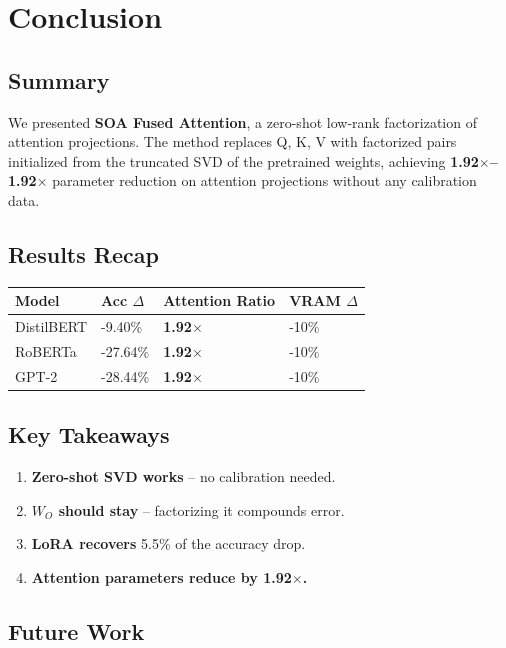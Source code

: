 \section{Conclusion}

\subsection{Summary}

We presented \textbf{SOA Fused Attention}, a zero-shot low-rank factorization of 
attention projections. The method replaces Q, K, V with factorized pairs 
initialized from the truncated SVD of the pretrained weights, achieving 
\textbf{1.92$\times$--1.92$\times$} parameter reduction on attention projections 
without any calibration data.

\subsection{Results Recap}

\begin{table}[H]
\centering
\small
\begin{tabular}{llll}
\toprule
\textbf{Model} & \textbf{Acc $\Delta$} & \textbf{Attention Ratio} & \textbf{VRAM $\Delta$} \\
\midrule
DistilBERT & -9.40\% & \textbf{1.92$\times$} & -10\% \\
RoBERTa & -27.64\% & \textbf{1.92$\times$} & -10\% \\
GPT-2 & -28.44\% & \textbf{1.92$\times$} & -10\% \\
\bottomrule
\end{tabular}
\end{table}

\subsection{Key Takeaways}

\begin{enumerate}
\item \textbf{Zero-shot SVD works} -- no calibration needed.
\item \textbf{$W_O$ should stay} -- factorizing it compounds error.
\item \textbf{LoRA recovers} 5.5\% of the accuracy drop.
\item \textbf{Attention parameters reduce by 1.92$\times$.}

\end{enumerate}
\subsection{Future Work}

